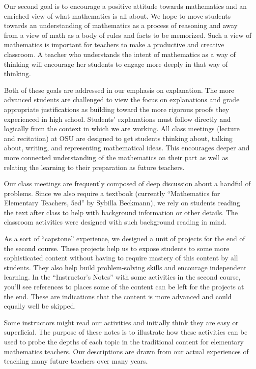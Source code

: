 \documentclass[nooutcomes]{ximera}
\begin{document}
Our second goal is to encourage a positive attitude towards mathematics and an enriched view 
of what mathematics is all about.  We hope to move students towards an understanding of mathematics
as a process of reasoning and away from a view of math as a body of 
rules and facts to be memorized. Such a view of mathematics is important for teachers to make a productive and 
creative classroom. A teacher who understands the intent of mathematics as a way of 
thinking will encourage her students to engage more deeply in that way of thinking.  

Both of these goals are addressed in our emphasis on explanation.  The more 
advanced students are challenged to view the focus on explanations and grade appropriate justifications as building toward the more rigorous proofs they experienced in high school.  
Students' explanations must follow directly and logically from the context in which we are working.  
All class meetings (lecture and recitation) at OSU are designed to get students thinking about, talking 
about, writing, and representing mathematical ideas.  This encourages deeper and more connected 
understanding of the mathematics on their part as well as relating the learning to their preparation as future teachers.  

Our class meetings are frequently composed of deep discussion about a handful of problems.  Since we also require 
a textbook (currently ``Mathematics for Elementary Teachers, 5ed'' by Sybilla Beckmann), we rely on 
students reading the text after class to help with background information or other details.  The 
classroom activities were designed with such background reading in mind.

As a sort of ``capstone'' experience, we designed a unit of projects for the end of the second 
course.  These projects help us to expose students to some more sophisticated content without 
having to require mastery of this content by all students.  They also help build problem-solving skills and 
encourage independent learning.  In the ``Instructor's Notes'' with some activities in the second 
course, you'll see references to places some of the content can be left for the projects at the end. 
These are indications that the content is more advanced and could equally well be skipped.

Some instructors might read our activities and initially think they are easy or superficial.  The purpose of these notes is to illustrate how these activities can be used to probe the depths of each topic in the traditional content for elementary mathematics teachers.  Our descriptions are drawn from our actual experiences of teaching many future teachers over many years.
\end{document}
